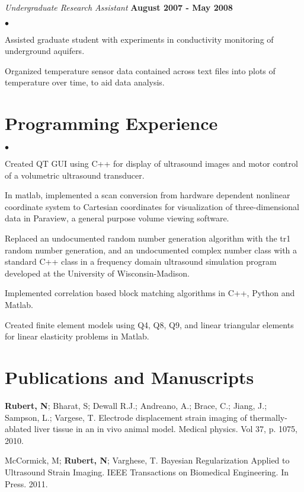 \documentclass[margin,line]{res}
\newenvironment{list2}{
  \begin{list}{$\bullet$}{%
      \setlength{\itemsep}{0in}
      \setlength{\parsep}{0in} \setlength{\parskip}{0in}
      \setlength{\topsep}{0in} \setlength{\partopsep}{0in}
      \setlength{\leftmargin}{0.2in}}}{\end{list}}
\begin{document}
\begin{resume}
\vspace{-.3cm}
{\em Undergraduate Research Assistant}  \hfill {\bf August 2007 - May 2008} \\
\begin{list2}
\item Assisted graduate student with experiments in conductivity monitoring of underground aquifers.
\item Organized temperature sensor data contained across text files into plots of temperature over time, to aid data analysis.
\end{list2}

\section{\sc Programming Experience}
\begin{list2}
\item Created QT GUI using C++ for display of ultrasound images and motor control of a volumetric ultrasound transducer.
\item In matlab, implemented a scan conversion from hardware dependent nonlinear coordinate system to Cartesian coordinates for visualization of 
      three-dimensional data in Paraview, a general purpose volume viewing software.
\item Replaced an undocumented random number generation algorithm with the tr1 random number generation, and an undocumented complex number class with a standard C++ class in a frequency domain ultrasound simulation program developed at the University of Wisconsin-Madison. 
\item Implemented correlation based block matching algorithms in C++, Python and Matlab.
\item Created finite element models using Q4, Q8, Q9, and linear triangular elements for linear elasticity problems in Matlab.
\end{list2}


\section{\sc Publications and Manuscripts}

{\bf Rubert, N}; Bharat, S; Dewall R.J.; Andreano, A.; Brace, C.; Jiang, J.; Sampson, L.; Vargese, T.  Electrode displacement strain imaging of thermally-ablated liver tissue in an in vivo animal model.  Medical physics. Vol 37, p. 1075, 2010.

McCormick, M; {\bf Rubert, N}; Varghese, T. Bayesian Regularization Applied to
Ultrasound Strain Imaging. IEEE Transactions on Biomedical Engineering.
In Press. 2011.


\end{resume}
\end{document}
